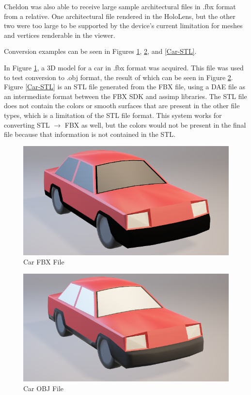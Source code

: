     Cheldon was also able to receive large sample architectural files in .fbx format from a relative. One architectural file rendered in the HoloLens, but the other two were too large to be supported by the device's current limitation for meshes and vertices renderable in the viewer.

    Conversion examples can be seen in Figures \ref{Car-FBX}, \ref{Car-OBJ}, and \ref{Car-STL}.  
    
    In Figure \ref{Car-FBX}, a 3D model for a car in .fbx format was acquired. This file was used to test conversion to .obj format, the result of which can be seen in Figure \ref{Car-OBJ}. Figure \ref{Car-STL} is an STL file generated from the FBX file, using a DAE file as an intermediate format between the FBX SDK and assimp libraries. The STL file does not contain the colors or smooth surfaces that are present in the other file types, which is a limitation of the STL file format. This system works for converting STL $\rightarrow$ FBX as well, but the colors would not be present in the final file because that information is not contained in the STL. 
    
\begin{figure}[H]
    \centering
    \includegraphics[width=\textwidth]{Car-FBX.png}
    \caption{Car FBX File}
    \label{Car-FBX}
\end{figure}

\begin{figure}[H]
    \centering
    \includegraphics[width=\textwidth]{Car-OBJ.png}
    \caption{Car OBJ File}
    \label{Car-OBJ}
\end{figure}

